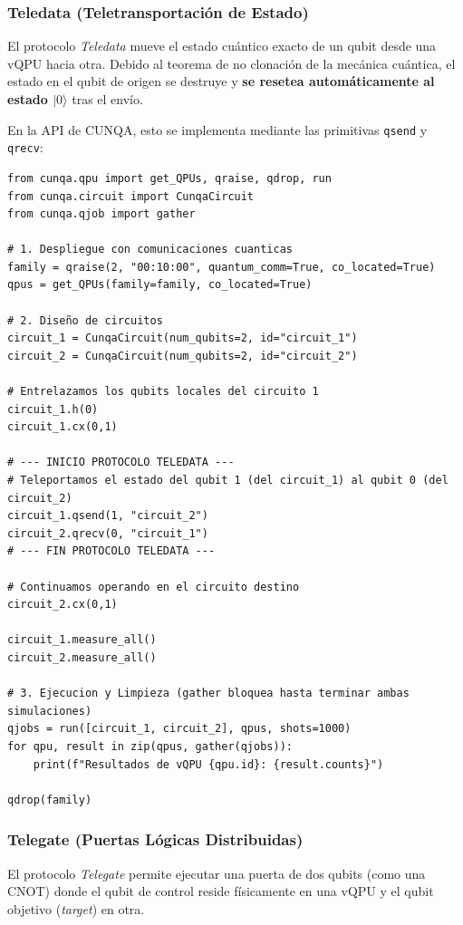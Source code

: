 \documentclass[a4paper,11pt]{article}
\begin{document}
\subsubsection{Teledata (Teletransportación de Estado)}
El protocolo \textit{Teledata} mueve el estado cuántico exacto de un qubit desde una vQPU hacia otra. Debido al teorema de no clonación de la mecánica cuántica, el estado en el qubit de origen se destruye y \textbf{se resetea automáticamente al estado $|0\rangle$} tras el envío.

En la API de CUNQA, esto se implementa mediante las primitivas \texttt{qsend} y \texttt{qrecv}:

\begin{lstlisting}[style=pythonstyle, caption=Ejemplo: Construcción remota de un estado entrelazado (Teledata)]
from cunqa.qpu import get_QPUs, qraise, qdrop, run
from cunqa.circuit import CunqaCircuit
from cunqa.qjob import gather

# 1. Despliegue con comunicaciones cuanticas
family = qraise(2, "00:10:00", quantum_comm=True, co_located=True)
qpus = get_QPUs(family=family, co_located=True)

# 2. Diseño de circuitos
circuit_1 = CunqaCircuit(num_qubits=2, id="circuit_1")
circuit_2 = CunqaCircuit(num_qubits=2, id="circuit_2")

# Entrelazamos los qubits locales del circuito 1
circuit_1.h(0)
circuit_1.cx(0,1)

# --- INICIO PROTOCOLO TELEDATA ---
# Teleportamos el estado del qubit 1 (del circuit_1) al qubit 0 (del circuit_2)
circuit_1.qsend(1, "circuit_2")
circuit_2.qrecv(0, "circuit_1")
# --- FIN PROTOCOLO TELEDATA ---

# Continuamos operando en el circuito destino
circuit_2.cx(0,1)

circuit_1.measure_all()
circuit_2.measure_all()

# 3. Ejecucion y Limpieza (gather bloquea hasta terminar ambas simulaciones)
qjobs = run([circuit_1, circuit_2], qpus, shots=1000)
for qpu, result in zip(qpus, gather(qjobs)):
    print(f"Resultados de vQPU {qpu.id}: {result.counts}")

qdrop(family)
\end{lstlisting}

\subsubsection{Telegate (Puertas Lógicas Distribuidas)}
El protocolo \textit{Telegate} permite ejecutar una puerta de dos qubits (como una CNOT) donde el qubit de control reside físicamente en una vQPU y el qubit objetivo (\textit{target}) en otra. 
\end{document}
